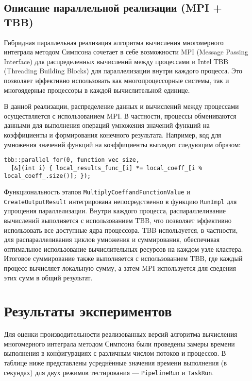 \documentclass[12pt]{article}
\begin{document}
\subsection{Описание параллельной реализации (MPI + TBB)}

\hspace*{1.35em}Гибридная параллельная реализация алгоритма вычисления многомерного интеграла методом Симпсона сочетает в себе возможности MPI (Message Passing Interface) для распределенных вычислений между процессами и Intel TBB (Threading Building Blocks) для параллелизации внутри каждого процесса. Это позволяет эффективно использовать как многопроцессорные системы, так и многоядерные процессоры в каждой вычислительной единице.

В данной реализации, распределение данных и вычислений между процессами осуществляется с использованием MPI. В частности, процессы обмениваются данными для выполнения операций умножения значений функций на коэффициенты и формирования конечного результата. Например, код для умножения значений функций на коэффициенты выглядит следующим образом:

\begin{verbatim}
tbb::parallel_for(0, function_vec_size,
  [&](int i) { local_results_func_[i] *= local_coeff_[i % local_coeff_.size()]; });
\end{verbatim}

Функциональность этапов \texttt{MultiplyCoeffandFunctionValue} и \texttt{CreateOutputResult} интегрирована непосредственно в функцию \texttt{RunImpl} для упрощения параллелизации. Внутри каждого процесса, распараллеливание вычислений выполняется с использованием TBB, что позволяет эффективно использовать все доступные ядра процессора. TBB используется, в частности, для распараллеливания циклов умножения и суммирования, обеспечивая оптимальное использование вычислительных ресурсов на каждом узле кластера.  Итоговое суммирование также выполняется с использованием TBB, где каждый процесс вычисляет локальную сумму, а затем MPI используется для сведения этих сумм в общий результат.

\section{Результаты экспериментов}

\hspace*{1.35em}Для оценки производительности реализованных версий алгоритма вычисления многомерного интеграла методом Симпсона были проведены замеры времени выполнения в конфигурациях с различным числом потоков и процессов. В таблице ниже представлены усреднённые значения времени выполнения (в секундах) для двух режимов тестирования — \texttt{PipelineRun} и \texttt{TaskRun}.
\end{document}
